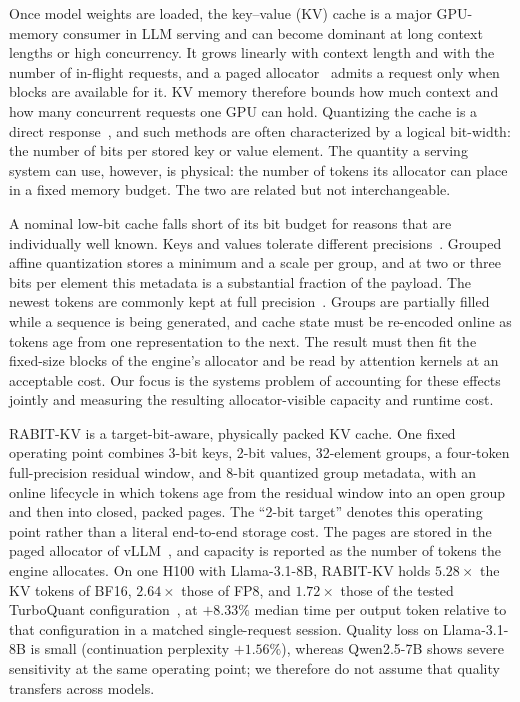 \documentclass{article}
\begin{document}
Once model weights are loaded, the key--value (KV) cache is a major GPU-memory consumer in LLM serving
and can become dominant at long context lengths or high concurrency. It grows linearly with context length and with the number of in-flight requests, and a
paged allocator~\citep{kwon2023vllm} admits a request only when blocks are available for it. KV memory therefore
bounds how much context and how many concurrent requests one GPU can hold. Quantizing the cache is a
direct response~\citep{liu2024kivi,hooper2024kvquant,zandieh2025turboquant}, and such methods are often
characterized by a logical bit-width: the number of bits per stored key or value element. The quantity a serving system can use,
however, is physical: the number of tokens its allocator can place in a fixed memory budget. The two
are related but not interchangeable.

A nominal low-bit cache falls short of its bit budget for reasons that are individually well known.
Keys and values tolerate different precisions~\citep{liu2024kivi,tao2024asymkv}. Grouped affine quantization stores a minimum and a scale
per group, and at two or three bits per element this metadata is a substantial fraction of the payload.
The newest tokens are commonly kept at full precision~\citep{liu2024kivi,duanmu2024skvq}. Groups are partially filled while a sequence is
being generated, and cache state must be re-encoded online as tokens age from one representation to the
next. The result must then fit the fixed-size blocks of the engine's allocator and be read by attention
kernels at an acceptable cost. Our focus is the systems problem of accounting for these effects jointly
and measuring the resulting allocator-visible capacity and runtime cost.

RABIT-KV is a target-bit-aware, physically packed KV cache. One fixed operating point combines 3-bit
keys, 2-bit values, 32-element groups, a four-token full-precision residual window, and 8-bit quantized
group metadata, with an online lifecycle in which tokens age from the residual window into an open
group and then into closed, packed pages. The ``2-bit target'' denotes this operating point rather than
a literal end-to-end storage cost. The pages are stored in the paged allocator of vLLM~\citep{kwon2023vllm}, and
capacity is reported as the number of tokens the engine allocates. On one H100 with Llama-3.1-8B,
RABIT-KV holds $5.28\times$ the KV tokens of BF16, $2.64\times$ those of FP8, and $1.72\times$
those of the tested TurboQuant configuration~\citep{zandieh2025turboquant,vllm2026turboquant}, at $+8.33\%$ median time per output token
relative to that configuration in a matched single-request session. Quality loss on Llama-3.1-8B is
small (continuation perplexity $+1.56\%$), whereas Qwen2.5-7B shows severe sensitivity at the same
operating point; we therefore do not assume that quality transfers across models.
\end{document}
